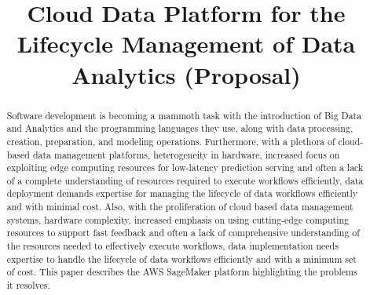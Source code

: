 \documentclass[conference]{IEEEtran}
\begin{document}
%
\title{Cloud Data Platform for the Lifecycle Management of Data Analytics (Proposal)}


\author{
	\and

}

\maketitle{}

\begin{abstract}
Software development is becoming a mammoth task with the introduction of Big Data and Analytics and the programming languages they use, along with data processing, creation, preparation,  and modeling operations.  Furthermore, with a plethora of cloud-based data management platforms, heterogeneity in hardware, increased focus on exploiting edge computing resources for low-latency prediction serving and often a lack of a complete understanding of resources required to execute workflows efficiently, data deployment demands expertise for managing the lifecycle of data workflows efficiently and with minimal cost. Also, with the proliferation of cloud based data management systems, hardware complexity, increased emphasis on using cutting-edge computing resources to support fast feedback and often a lack of comprehensive understanding of the resources needed to effectively execute workflows, data implementation needs expertise to handle the lifecycle of data workflows efficiently and with a minimum set of cost.  This paper describes the AWS SageMaker platform highlighting the problems it resolves.

\end{abstract}
\end{document}
